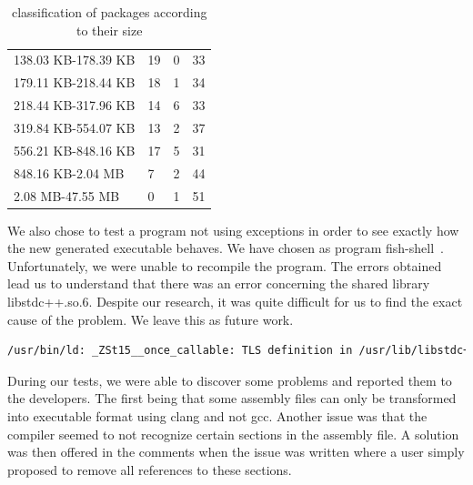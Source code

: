 \documentclass[a4paper,11pt,oneside]{report}
\begin{document}
\begin{table}[H]
\begin{tabular}{llll}
        138.03 KB-178.39 KB & 19                           & 0                                 & 33                                    \\
        179.11 KB-218.44 KB & 18                           & 1                                 & 34                                    \\
        218.44 KB-317.96 KB & 14                           & 6                                 & 33                                    \\
        319.84 KB-554.07 KB & 13                           & 2                                 & 37                                    \\
        556.21 KB-848.16 KB & 17                           & 5                                 & 31                                    \\
        848.16 KB-2.04 MB   & 7                            & 2                                 & 44                                    \\
        2.08 MB-47.55 MB    & 0                            & 1                                 & 51    \\                               
        \hline
    \end{tabular}
    \caption{classification of packages according to their size}
\end{table}

We also chose to test a program not using exceptions in order to see exactly how the
new generated executable behaves. We have chosen as program
fish-shell~\cite{fish}. Unfortunately, we were unable to recompile the program.
The errors obtained lead us to understand that there was an error concerning
the shared library libstdc++.so.6. Despite our research, it was quite difficult
for us to find the exact cause of the problem. We leave this as future work.
\begin{lstlisting}[language=bash]
/usr/bin/ld: _ZSt15__once_callable: TLS definition in /usr/lib/libstdc++.so.6 section .tbss mismatches non-TLS reference in /tmp/ccAGaHdi.o
\end{lstlisting}

During our tests, we were able to discover some problems and reported them to
the developers. The first being that some assembly files can only be
transformed into executable format using clang and not gcc. Another issue was
that the compiler seemed to not recognize certain sections in the assembly
file. A solution was then offered in the comments when the issue was written
where a user simply proposed to remove all references to these sections.
\end{document}
